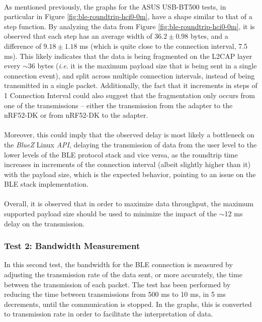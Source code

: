 \paragraph{} As mentioned previously, the graphs for the ASUS USB-BT500 tests, in particular in Figure \ref{fig:ble-roundtrip-hci0-0m}, have a shape similar to that of a step function. By analyzing the data from Figure \ref{fig:ble-roundtrip-hci0-0m}, it is observed that each step has an average width of $36.2 \pm 0.98$ bytes, and a difference of $9.18 \pm 1.18$ ms (which is quite close to the connection interval, 7.5 ms). This likely indicates that the data is being fragmented on the \acs{L2CAP} layer every ${\sim} $36 bytes (\textit{i.e.} it is the maximum payload size that is being sent in a single connection event), and split across multiple connection intervals, instead of being transmitted in a single packet. Additionally, the fact that it increments in steps of 1 Connection Interval could also suggest that the fragmentation only occurs from one of the transmissions -- either the transmission from the adapter to the nRF52-DK or from nRF52-DK to the adapter. 

\paragraph{} Moreover, this could imply that the observed delay is most likely a bottleneck on the \textit{BlueZ} Linux \textit{API}, delaying the transmission of data from the user level to the lower levels of the \acs{BLE} protocol stack and vice versa, as the roundtrip time increases in increments of the connection interval (albeit slightly higher than it) with the payload size, which is the expected behavior, pointing to an issue on the \acs{BLE} stack implementation.

\paragraph{} Overall, it is observed that in order to maximize data throughput, the maximum supported payload size should be used to minimize the impact of the ${\sim} $12 ms delay on the transmission.

\subsubsection{Test 2: Bandwidth Measurement}

In this second test, the bandwidth for the \acs{BLE} connection is measured by adjusting the transmission rate of the data sent, or more accurately, the time between the transmission of each packet. The test has been performed by reducing the time between transmissions from 500 ms to 10 ms, in 5 ms decrements, until the communication is stopped. In the graphs, this is converted to transmission rate in order to facilitate the interpretation of data.

